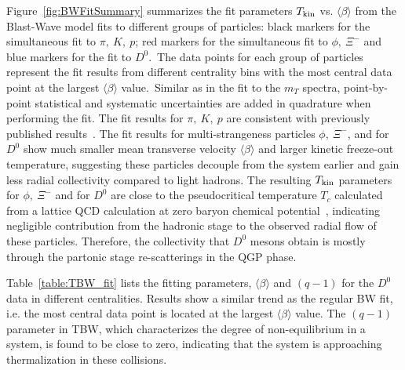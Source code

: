 \documentclass[%
 reprint,	
showpacs,
 amsmath,amssymb,
 aps,
 prc,
]{revtex4-1}
\begin{document}
Figure~\ref{fig:BWFitSummary} summarizes the fit parameters $T_{\rm kin}$ vs. $\langle\beta\rangle$ from the Blast-Wave model fits to different groups of particles: black markers for the simultaneous fit to $\pi,\ K,\ p$; red markers for the simultaneous fit to $\phi,\ \Xi^-$ and blue markers for the fit to $D^0$.\,\,\,The data points for each group of particles represent the fit results from different centrality bins with the most central data point at the largest $\langle\beta\rangle$ value.\,\,\,Similar as in the fit to the $m_{T}$ spectra, point-by-point statistical and systematic uncertainties are added in quadrature when performing the fit. The fit results for $\pi,\ K,\ p$ are consistent with previously published results~\cite{Tang:2008ud}. The fit results for multi-strangeness particles $\phi,\ \Xi^{-}$, and for $D^0$ show much smaller mean transverse velocity $\langle\beta\rangle$ and larger kinetic freeze-out temperature, suggesting these particles decouple from the system earlier and gain less radial collectivity compared to light hadrons. The resulting $T_{\rm kin}$ parameters for $\phi,\ \Xi^-$ and for $D^0$ are close to the pseudocritical temperature $T_{c}$ calculated from a lattice QCD calculation at zero baryon chemical potential~\cite{Bazavov:2011nk}, indicating negligible contribution from the hadronic stage to the observed radial flow of these particles.\,\,Therefore, the collectivity that $D^0$ mesons obtain is mostly through the partonic stage re-scatterings in the QGP phase. 

Table~\ref{table:TBW_fit} lists the fitting parameters, $\langle\beta\rangle$ and $(q-1)$ for the $D^0$ data in different centralities. Results show a similar trend as the regular BW fit, i.e. the most central data point is located at the largest $\langle\beta\rangle$ value. The $(q-1)$ parameter in TBW, which characterizes the degree of non-equilibrium in a system, is found to be close to zero, indicating that the system is approaching thermalization in these collisions.
\end{document}
